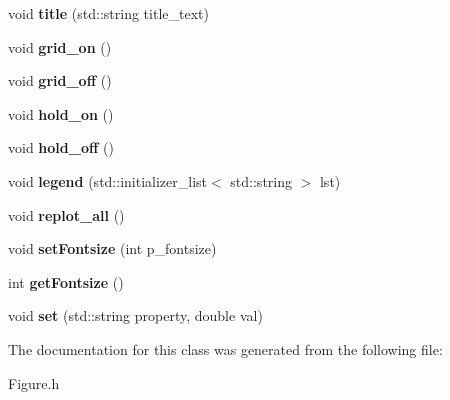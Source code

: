 \begin{DoxyCompactItemize}
\item 
\hypertarget{classkeycpp_1_1_figure_a922bd966ed40095f0ae7fa184f9d0ada}{void {\bfseries title} (std\-::string title\-\_\-text)}\label{classkeycpp_1_1_figure_a922bd966ed40095f0ae7fa184f9d0ada}

\item 
\hypertarget{classkeycpp_1_1_figure_a3c036559f8ad56b099ac0b44c652225d}{void {\bfseries grid\-\_\-on} ()}\label{classkeycpp_1_1_figure_a3c036559f8ad56b099ac0b44c652225d}

\item 
\hypertarget{classkeycpp_1_1_figure_a3736e01bc278c2c2b47e4ff046fdda0e}{void {\bfseries grid\-\_\-off} ()}\label{classkeycpp_1_1_figure_a3736e01bc278c2c2b47e4ff046fdda0e}

\item 
\hypertarget{classkeycpp_1_1_figure_a65b80e5b67c7bbf225e3001a538a6dad}{void {\bfseries hold\-\_\-on} ()}\label{classkeycpp_1_1_figure_a65b80e5b67c7bbf225e3001a538a6dad}

\item 
\hypertarget{classkeycpp_1_1_figure_ae5e5ac67e9450ea4fbf06fb3fcc6523a}{void {\bfseries hold\-\_\-off} ()}\label{classkeycpp_1_1_figure_ae5e5ac67e9450ea4fbf06fb3fcc6523a}

\item 
\hypertarget{classkeycpp_1_1_figure_a315140182f731518bc1f6f037a12c3a5}{void {\bfseries legend} (std\-::initializer\-\_\-list$<$ std\-::string $>$ lst)}\label{classkeycpp_1_1_figure_a315140182f731518bc1f6f037a12c3a5}

\item 
\hypertarget{classkeycpp_1_1_figure_a47cae082612e5436a6b0bc3d7f27e9d9}{void {\bfseries replot\-\_\-all} ()}\label{classkeycpp_1_1_figure_a47cae082612e5436a6b0bc3d7f27e9d9}

\item 
\hypertarget{classkeycpp_1_1_figure_ab8d777d1b44e242b104350093ef09543}{void {\bfseries set\-Fontsize} (int p\-\_\-fontsize)}\label{classkeycpp_1_1_figure_ab8d777d1b44e242b104350093ef09543}

\item 
\hypertarget{classkeycpp_1_1_figure_a6c1e59c4e8288e3880bde70db3723037}{int {\bfseries get\-Fontsize} ()}\label{classkeycpp_1_1_figure_a6c1e59c4e8288e3880bde70db3723037}

\item 
\hypertarget{classkeycpp_1_1_figure_a7375fe8611759fda180d626f91eab510}{void {\bfseries set} (std\-::string property, double val)}\label{classkeycpp_1_1_figure_a7375fe8611759fda180d626f91eab510}

\end{DoxyCompactItemize}


The documentation for this class was generated from the following file\-:\begin{DoxyCompactItemize}
\item 
Figure.\-h\end{DoxyCompactItemize}
